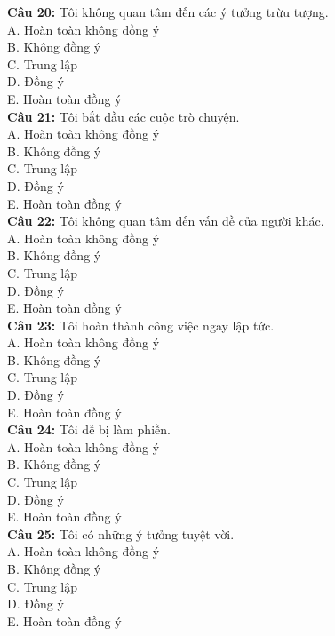 \begin{multicols}{2}
\textbf{Câu 20:} Tôi không quan tâm đến các ý tưởng trừu tượng. \\
A. Hoàn toàn không đồng ý \\
B. Không đồng ý \\
C. Trung lập \\
D. Đồng ý \\
E. Hoàn toàn đồng ý \\

\textbf{Câu 21:} Tôi bắt đầu các cuộc trò chuyện. \\
A. Hoàn toàn không đồng ý \\
B. Không đồng ý \\
C. Trung lập \\
D. Đồng ý \\
E. Hoàn toàn đồng ý \\

\textbf{Câu 22:} Tôi không quan tâm đến vấn đề của người khác. \\
A. Hoàn toàn không đồng ý \\
B. Không đồng ý \\
C. Trung lập \\
D. Đồng ý \\
E. Hoàn toàn đồng ý \\

\textbf{Câu 23:} Tôi hoàn thành công việc ngay lập tức. \\
A. Hoàn toàn không đồng ý \\
B. Không đồng ý \\
C. Trung lập \\
D. Đồng ý \\
E. Hoàn toàn đồng ý \\

\textbf{Câu 24:} Tôi dễ bị làm phiền. \\
A. Hoàn toàn không đồng ý \\
B. Không đồng ý \\
C. Trung lập \\
D. Đồng ý \\
E. Hoàn toàn đồng ý \\

\textbf{Câu 25:} Tôi có những ý tưởng tuyệt vời. \\
A. Hoàn toàn không đồng ý \\
B. Không đồng ý \\
C. Trung lập \\
D. Đồng ý \\
E. Hoàn toàn đồng ý \\


\end{multicols}
